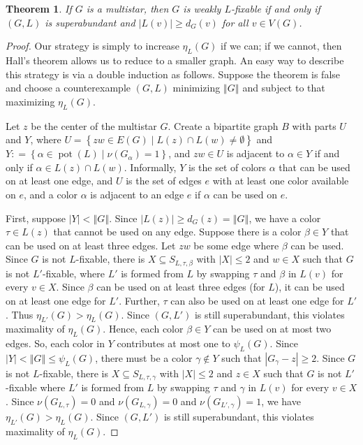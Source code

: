 \documentclass[12pt]{article}
\theoremstyle{plain}
\newtheorem{thm}{Theorem}[section]
\theoremstyle{definition}
\theoremstyle{remark}
\newcommand{\setb}[3]{\left\{ #1 \in #2 \mid #3 \right\}}
\newcommand{\size}[1]{\left\Vert#1\right\Vert}
\newcommand{\DefinedAs}{\mathrel{\mathop:}=}
\newcommand{\pot}{\operatorname{pot}}
\begin{document}
\begin{thm}\label{FixabilityOfStars}
If $G$ is a multistar, then $G$ is weakly $L$-fixable if and only if $(G, L)$ is superabundant and $|L(v)| \ge d_G(v)$ for all $v \in V(G)$.
\end{thm}
\begin{proof}
	Our strategy is simply to increase $\eta_L(G)$ if we can; if we cannot, then Hall's theorem allows us to reduce to a smaller graph.  An easy way to describe this strategy is via a double induction as follows. Suppose the theorem is false and choose a counterexample $(G, L)$ minimizing $\size{G}$ and subject to that maximizing $\eta_L(G)$.  
	
Let $z$ be the center of the multistar $G$. Create a bipartite graph $B$ with
parts $U$ and $Y$, where $U = \setb{zw}{E(G)}{L(z) \cap L(w) \ne \emptyset}$
and $Y \DefinedAs \setb{\alpha}{\pot(L)}{\nu(G_\alpha) = 1}$, and $zw \in U$ is adjacent
to $\alpha \in Y$ if and only if $\alpha \in L(z) \cap L(w)$. Informally, $Y$
is the set of colors $\alpha$ that can be used on at least one edge, and $U$ is
the set of edges $e$ with at least one color available on $e$, and a color
$\alpha$ is adjacent to an edge $e$ if $\alpha$ can be used on $e$.
	
First, suppose $|Y| < \size{G}$.  Since $|L(z)| \ge d_G(z) = \size{G}$, we
have a color $\tau \in L(z)$ that cannot be used on any edge.  Suppose there is
a color $\beta \in Y$ that can be used on at least three edges.  
Let $zw$ be some edge where $\beta$ can be used.
Since $G$ is not $L$-fixable, there is $X \subseteq S_{L, \tau, \beta}$ with
$|X| \le 2$ and $w \in X$ such that $G$ is not $L'$-fixable, where $L'$ is formed
from $L$ by swapping $\tau$ and $\beta$ in $L(v)$ for every $v \in X$.  Since
$\beta$ can be used on at least three edges (for $L$), it can be used on at
least one edge for $L'$.  Further, $\tau$ can also be used on at least one edge
for $L'$.  Thus $\eta_{L'}(G) > \eta_L(G)$.  Since $(G,L')$ is still
superabundant, this violates maximality of $\eta_L(G)$.  Hence, 
each color $\beta \in Y$ can be used on at most two edges.  So, each color in $Y$
contributes at most one to $\psi_L(G)$.  Since $|Y| < \size{G} \le \psi_L(G)$,
there must be a color $\gamma \not \in Y$ such that $|G_\gamma - z| \ge 2$.  Since $G$
is not $L$-fixable, there is $X \subseteq S_{L, \tau, \gamma}$ with $|X| \le 2$
and $z \in X$ such that $G$ is not $L'$-fixable where $L'$ is formed from $L$
by swapping $\tau$ and $\gamma$ in $L(v)$ for every $v \in X$.  Since
$\nu(G_{L, \tau}) = 0$ and $\nu(G_{L, \gamma}) = 0$ and $\nu(G_{L', \gamma}) =
1$, we have $\eta_{L'}(G) > \eta_L(G)$. Since $(G,L')$ is still superabundant,
this violates maximality of $\eta_L(G)$.  


\end{proof}
\end{document}
